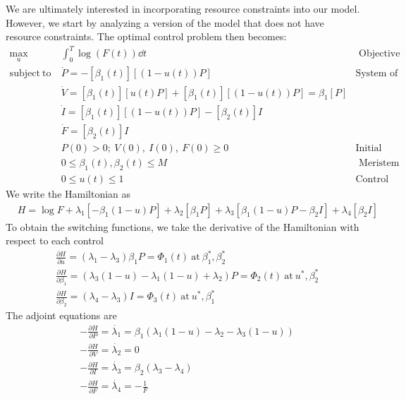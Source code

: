 \documentclass[12pt, oneside]{article}   	%
\begin{document}
We are ultimately interested in incorporating resource constraints into our model. However, we start by analyzing a version of the model that does not have resource constraints. The optimal control problem then becomes:
%
\begin{align}
\max_{u} &  \int_0^T  \log( F(t) ) \dd {t} & \mbox{ Objective function }  \nonumber \\
\mathrm{subject\ to\ } 
& \dot{P} = - [\beta_1(t)] [(1 - u(t)) P ] & \mbox{System of ODEs} \nonumber \\
& \dot{V} = [\beta_1(t)] [ u(t) P]  + [\beta_1(t)] [(1 - u(t)) P] = \beta_1 [P]  \nonumber \\ 
& \dot{I} = [\beta_1(t)] [( 1-u(t) ) P] - [\beta_2(t)] I  \\ 
& \dot{F} = [\beta_2(t)] I  \nonumber \\ 
& P(0) > 0;\ V(0),\ I(0),\ F(0) \geq 0 & \mbox{Initial conditions}  \nonumber \\
& 0 \le \beta_1(t), \beta_2(t) \le M & \mbox{ Meristem constraint}  \nonumber \\
& 0 \leq u(t) \leq 1 & \mbox{Control constraint}  \nonumber
\end{align}
%
We write the Hamiltonian as
%
\begin{align}
& H = \log F + \lambda_1 [ - \beta_1 (1-u) P ] + \lambda_2 [ \beta_1 P ]  + \lambda_3 [ \beta_1 (1-u) P - \beta_2 I ] + \lambda_4 [ \beta_2 I ] 
\end{align}
%
To obtain the switching functions, we take the derivative of the Hamiltonian with respect to each control 
%
\begin{align}
& \frac{\partial H}{\partial u} = (\lambda_1 - \lambda_3) \beta_1 P = \Phi_1(t) \ \mathrm{at}\ \beta_1^*, \beta_2^* \\
&\frac{\partial H}{\partial \beta_1} =  (\lambda_3(1-u) - \lambda_1 (1-u) + \lambda_2 ) P = \Phi_2(t) \ \mathrm{at}\ u^*, \beta_2^* \\
&\frac{\partial H}{\partial \beta_2} =  (\lambda_4 - \lambda_3) I = \Phi_3(t) \ \mathrm{at}\ u^*, \beta_1^*
\end{align}
%
The adjoint equations are
%
\begin{align}
&-\frac{\partial H}{\partial P} = \dot{\lambda_1}  = \beta_1 ( \lambda_1 (1-u) - \lambda_2 - \lambda_3 (1-u) ) \nonumber \\
&-\frac{\partial H}{\partial V} = \dot{\lambda_2}  = 0  \nonumber\\
&-\frac{\partial H}{\partial I} = \dot{\lambda_3}  = \beta_2(\lambda_3-\lambda_4) \nonumber \\
&-\frac{\partial H}{\partial F} = \dot{\lambda_4}  = -\frac{1}{F}  
\end{align}
\end{document}
